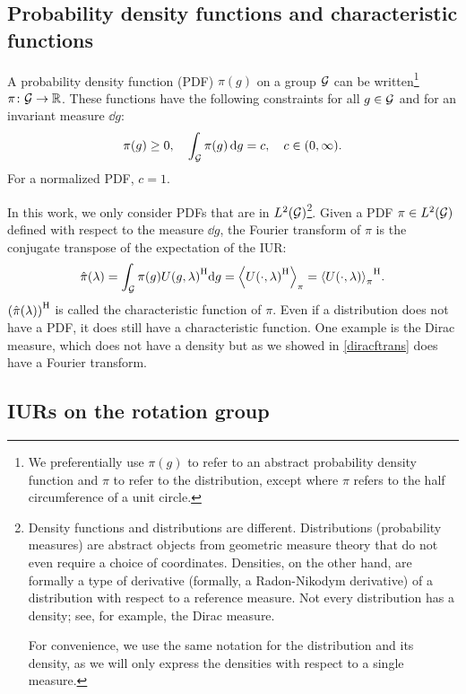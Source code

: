 \documentclass[../../main.tex]{subfiles}
\begin{document}
\begin{refsection}
	\subsection{Probability density functions and characteristic functions}

	A probability density function (PDF) $\pi(g)$ on a group $\mathcal{G}$ can be written\footnote{
		We preferentially use $\pi(g)$ to refer to an abstract probability density function and $\pi$ to refer to the distribution, except where $\pi$ refers to the half circumference of a unit circle.
	} $\pi \colon \mathcal{G} \to \mathbb{R}$.
	These functions have the following constraints for all $g \in \mathcal{G}$ and for an invariant measure $\dd{g}$:
	$$\pi(g) \ge 0, \quad \int_{\mathcal{G}} \pi(g) \dd{g} = c, \quad c \in (0, \infty).$$
	For a normalized PDF, $c = 1$.

	In this work, we only consider PDFs that are in $L^2(\mathcal{G})$\footnote{
		Density functions and distributions are different.
		Distributions (\ie probability measures) are abstract objects from geometric measure theory that do not even require a choice of coordinates.
		Densities, on the other hand, are formally a type of derivative (formally, a Radon-Nikodym derivative) of a distribution with respect to a reference measure.
		Not every distribution has a density; see, for example, the Dirac measure.

		For convenience, we use the same notation for the distribution and its density, as we will only express the densities with respect to a single measure.
	}.
	Given a PDF $\pi \in L^2(\mathcal{G})$ defined with respect to the measure $\dd{g}$, the Fourier transform of $\pi$ is the conjugate transpose of the expectation of the IUR:
	\begin{equation}\label{ftrans_pdf}
		\hat{\pi}(\lambda) = \int_{\mathcal{G}} \pi(g) {U(g, \lambda)}^\mathrm{H} \dd g = \left\langle {U(\cdot, \lambda)}^\mathrm{H} \right\rangle_{\pi} = {\left\langle U(\cdot, \lambda) \right\rangle_{\pi}}^\mathrm{H}.
	\end{equation}
	${\qty(\hat{\pi}(\lambda))}^\mathrm{H}$ is called the characteristic function of $\pi$.
	Even if a distribution does not have a PDF, it does still have a characteristic function.
	One example is the Dirac measure, which does not have a density but as we showed in \cref{diracftrans} does have a Fourier transform.

	\subsection{IURs on the rotation group}


\end{refsection}
\end{document}
